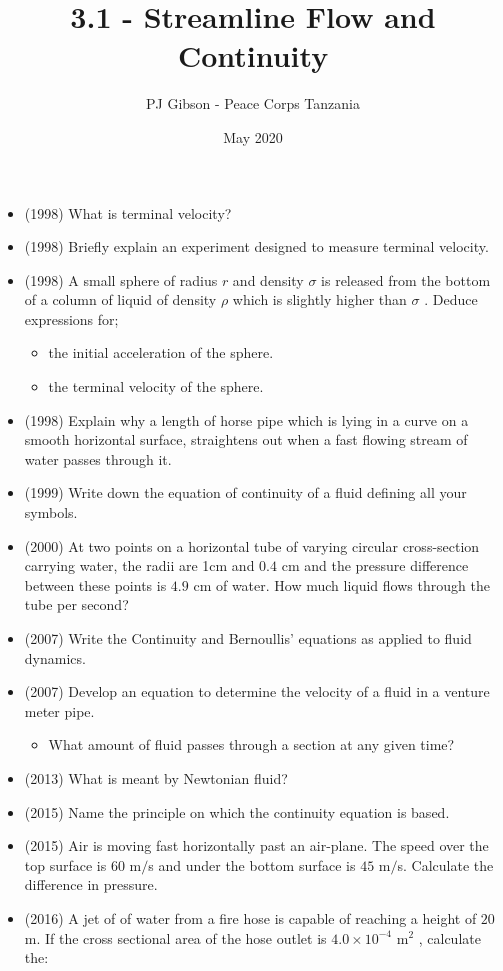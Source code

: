 \documentclass{article}
\title{\textbf{3.1 - Streamline Flow and Continuity}}
\author{PJ Gibson - Peace Corps Tanzania}
\date{May 2020}
\begin{document}
\maketitle

\begin{itemize}
\item (1998)  What is terminal velocity?
\item (1998)  Briefly explain an experiment designed to measure terminal velocity.
\item (1998)  A small sphere of radius $ r$ and density $ \sigma $ is released from the bottom of a column of liquid of density $ \rho $ which is slightly higher than $ \sigma $ . Deduce expressions for;
 \begin{itemize}
\item the initial acceleration of the sphere.
\item the terminal velocity of the sphere.
\end{itemize}
\item (1998)  Explain why a length of horse pipe which is lying in a curve on a smooth horizontal surface, straightens out when a fast flowing stream of water passes through it.
\item (1999)  Write down the equation of continuity of a fluid defining all your symbols.
\item (2000)  At two points on a horizontal tube of varying circular cross-section carrying water, the radii are 1cm and $ 0.4$ cm and the pressure difference between these points is $ 4.9$ cm of water. How much liquid flows through the tube per second?
\item (2007)  Write the Continuity and Bernoullis’ equations as applied to fluid dynamics. 
\item (2007)  Develop an equation to determine the velocity of a fluid in a venture meter pipe.
 \begin{itemize}
\item What amount of fluid passes through a section at any given time? 
\end{itemize}
\item (2013)  What is meant by Newtonian fluid? 
\item (2015)  Name the principle on which the continuity equation is based.
\item (2015)  Air is moving fast horizontally past an air-plane.  The speed over the top surface is $ 60$ m$/$s and under the bottom surface is $ 45$ m$/$s.  Calculate the difference in pressure.
\item (2016)   A jet of of water from a fire hose is capable of reaching a height of $ 20$ m.  If the cross sectional area of the hose outlet is $ 4.0	\times 10^{-4}$ m$ ^{2}$ , calculate the:

\end{itemize}
\end{document}
